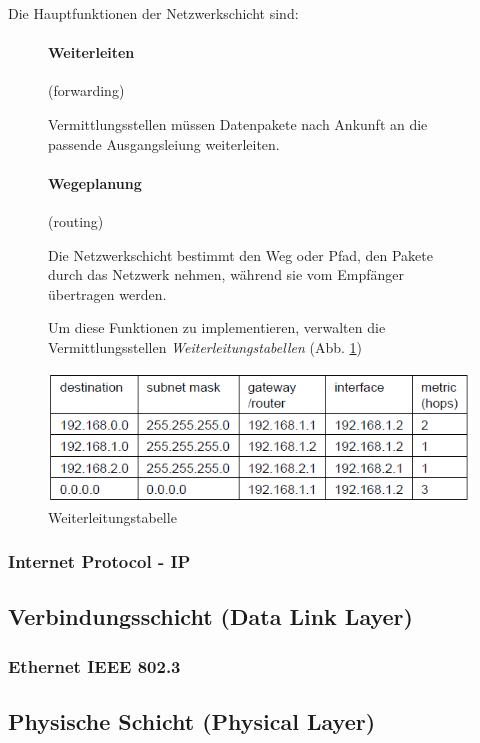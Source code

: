 \documentclass[12pt]{report}
\begin{document}
Die Hauptfunktionen der Netzwerkschicht sind:
\begin{figure}[H]
  \begin{minipage}[t]{0.45\textwidth}
    \paragraph{Weiterleiten} (forwarding)
    
    Vermittlungsstellen müssen Datenpakete nach Ankunft an die passende Ausgangsleiung weiterleiten.
  \end{minipage}
  \hfill
  \begin{minipage}[t]{0.45\textwidth}
    \paragraph{Wegeplanung} (routing)
    
    Die Netzwerkschicht bestimmt den Weg oder Pfad, den Pakete durch das Netzwerk nehmen,
    während sie vom Empfänger übertragen werden.
  \end{minipage}
\end{figure}
\begin{figure}[H]
  \begin{minipage}[t]{0.45\textwidth}
    Um diese Funktionen zu implementieren, verwalten die Vermittlungsstellen \textit{Weiterleitungstabellen} (Abb. \ref{fig:weiterleitungstabelle})
  \end{minipage}
  \hfill
  \begin{minipage}[t]{0.45\textwidth}
    \caption{Weiterleitungstabelle}
    \label{fig:weiterleitungstabelle}
    \centering
    \includegraphics[width=\textwidth]{weiterleitungstabelle}
  \end{minipage}
\end{figure}

\subsubsection{Internet Protocol - IP}


\subsection{Verbindungsschicht (Data Link Layer)}
\subsubsection{Ethernet IEEE 802.3}

\subsection{Physische Schicht (Physical Layer)}
\end{document}
